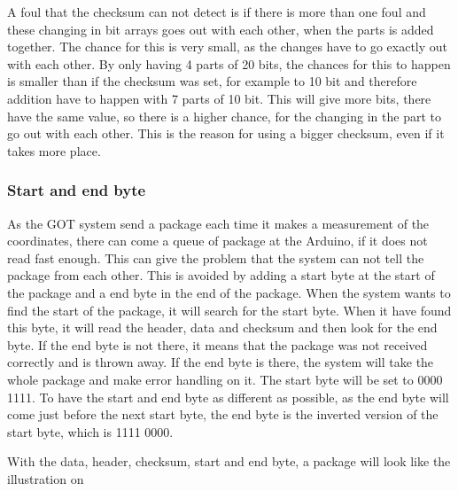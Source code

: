 A foul that the checksum can not detect is if there is more than one foul and these changing in bit arrays goes out with each other, when the parts is added together. The chance for this is very small, as the changes have to go exactly out with each other. By only having 4 parts of 20 bits, the chances for this to happen is smaller than if the checksum was set, for example to 10 bit and therefore addition have to happen with 7 parts of 10 bit. This will give more bits, there have the same value, so there is a higher chance, for the changing in the part to go out with each other. This is the reason for using a bigger checksum, even if it takes more place.

\subsubsection{Start and end byte}
As the GOT system send a package each time it makes a measurement of the coordinates, there can come a queue of package at the Arduino, if it does not read fast enough. This can give the problem that the system can not tell the package from each other. This is avoided by adding a start byte at the start of the package and a end byte in the end of the package. When the system wants to find the start of the package, it will search for the start byte. When it have found this byte, it will read the header, data and checksum and then look for the end byte. If the end byte is not there, it means that the package was not received correctly and is thrown away. If the end byte is there, the system will take the whole package and make error handling on it. The start byte will be set to 0000 1111. To have the start and end byte as different as possible, as the end byte will come just before the next start byte, the end byte is the inverted version of the start byte, which is 1111 0000.

With the data, header, checksum, start and end byte, a package will look like the illustration on 

